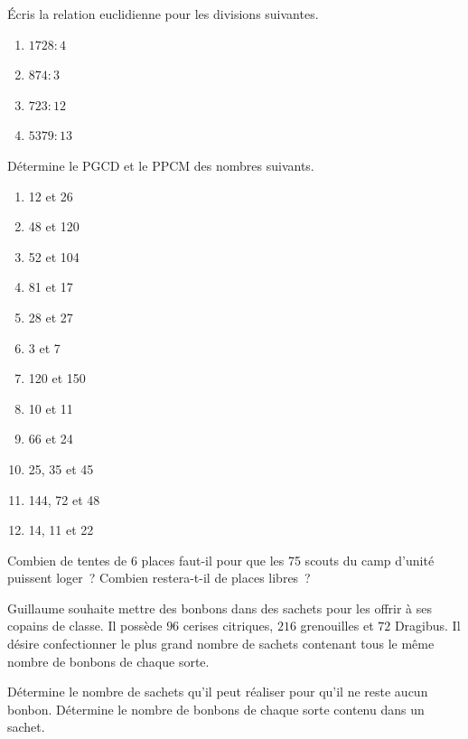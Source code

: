\documentclass[../math2.tex]{subfiles}
\begin{document}
\begin{exercise}
    Écris la relation euclidienne pour les divisions suivantes.
    \begin{enumerate}[cols=4]
        \item $1728:4$
        \item $874:3$
        \item $723:12$
        \item $5379:13$
    \end{enumerate}
\end{exercise}

\begin{exercise}
    Détermine le PGCD et le PPCM des nombres suivants.
    \begin{enumerate}[cols=4]
        \item 12 et 26
        \item 48 et 120
        \item 52 et 104
        \item 81 et 17
        \item 28 et 27
        \item 3 et 7
        \item 120 et 150
        \item 10 et 11
        \item 66 et 24
        \item 25, 35 et 45
        \item 144, 72 et 48
        \item 14, 11 et 22
    \end{enumerate}
\end{exercise}

\begin{exercise}
    Combien de tentes de 6 places faut-il pour que les 75 scouts du camp d'unité puissent loger~? Combien restera-t-il de places libres~?
\end{exercise}

\begin{exercise}
    Guillaume souhaite mettre des bonbons dans des sachets pour les offrir à ses copains de classe. Il possède $96$ cerises citriques, $216$ grenouilles et $72$ Dragibus. Il désire confectionner le plus grand nombre de sachets contenant tous le même nombre de bonbons de chaque sorte.
    \begin{tasks}
        \task Détermine le nombre de sachets qu'il peut réaliser pour qu'il ne reste aucun bonbon.
        \task Détermine le nombre de bonbons de chaque sorte contenu dans un sachet.
    \end{tasks}
\end{exercise}
\end{document}
